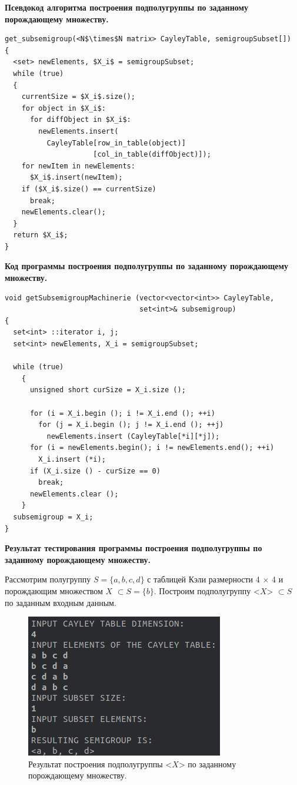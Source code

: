 \documentclass[spec, och, otchet, hidelinks]{SCWorks}
\newcommand{\tbf}[1]{\textbf{#1}}
\begin{document}
\par \tbf{Псевдокод алгоритма построения подполугруппы по заданному порождающему
множеству.}
\begin{lstlisting}[caption=Псевдокод алгоритма., mathescape]
get_subsemigroup(<N$\times$N matrix> CayleyTable, semigroupSubset[])
{
  <set> newElements, $X_i$ = semigroupSubset;
  while (true)
  {
    currentSize = $X_i$.size();
    for object in $X_i$:
      for diffObject in $X_i$:
        newElements.insert(
          CayleyTable[row_in_table(object)]
                     [col_in_table(diffObject)]);
    for newItem in newElements:
      $X_i$.insert(newItem);
    if ($X_i$.size() == currentSize)
      break;
    newElements.clear();
  }
  return $X_i$;
}
\end{lstlisting}

\par \tbf{Код программы построения подполугруппы по заданному порождающему множеству.}
\begin{lstlisting}[caption=Код программы., mathescape]
void getSubsemigroupMachinerie (vector<vector<int>> CayleyTable, 
                                set<int>& subsemigroup)
{
  set<int> ::iterator i, j;
  set<int> newElements, X_i = semigroupSubset;

  while (true)
    {
      unsigned short curSize = X_i.size ();

      for (i = X_i.begin (); i != X_i.end (); ++i)
        for (j = X_i.begin (); j != X_i.end (); ++j)
          newElements.insert (CayleyTable[*i][*j]);
      for (i = newElements.begin(); i != newElements.end(); ++i)
        X_i.insert (*i);
      if (X_i.size () - curSize == 0)
        break;
      newElements.clear ();
    }
  subsemigroup = X_i;
}
\end{lstlisting}

\newpage

\par \tbf{Результат тестирования программы построения подполугруппы по заданному
порождающему множеству.}

\par Рассмотрим полугруппу $S = \{a, b, c, d\}$ с таблицей Кэли размерности 4
$\times$ 4 и порождающим множеством $X$ $\subset S = \{b\}$. Построим
подполугруппу <$X$> $\subset S$ по заданным входным данным.

\begin{figure}[h!]
  \center\includegraphics[scale=0.65]{construct_semigroup.png}
  \caption{Результат построения подполугруппы <$X$> по заданному порождающему
    множеству.}
\end{figure}
\end{document}
